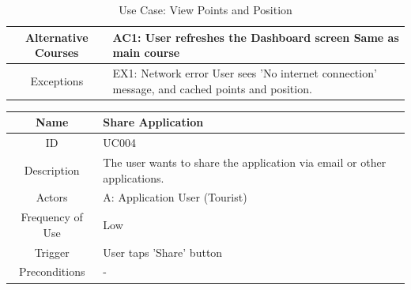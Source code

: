 \documentclass[12pt, a4paper, oneside]{article}
\begin{document}
\begin{table}[H]
\begin{tabularx}{\linewidth}{|c|X|}
Alternative Courses & AC1: User refreshes the Dashboard screen \newline Same as main course                                                                                             \\ \hline
Exceptions          & EX1: Network error \newline User sees 'No internet connection' message, and cached points and position.  \\ \hline
\end{tabularx}
\caption{Use Case: View Points and Position}
\label{uc-view-points}
\end{table}

\begin{table}[H]
\begin{tabularx}{\linewidth}{|c|X|}
\hline
Name                & Share Application                                                                                                                                                                                                                      \\ \hline
ID                  & UC004                                                                                                                                                                                                                       \\ \hline
Description         & The user wants to share the application via email or other applications.                                                                                                                                                    \\ \hline
Actors              & A: Application User (Tourist)                                                                                                                                                                                                  \\ \hline
Frequency of Use    & Low                                                                                                                                                                                                                    \\ \hline
Trigger             & User taps 'Share' button                                                                                                                                                                                           \\ \hline
Preconditions       & -                                                                                                                                                                                                                           \\ \hline

\end{tabularx}
\end{table}
\end{document}
